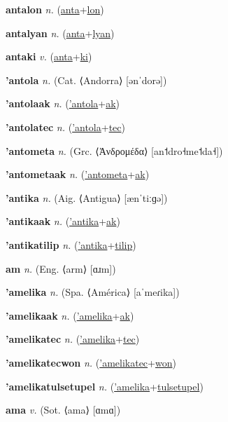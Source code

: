 \textbf{\hypertarget{antalon}{antalon}} \textit{n.} (\hyperlink{anta}{anta}+\allowbreak \hyperlink{lon}{lon})


\textbf{\hypertarget{antalyan}{antalyan}} \textit{n.} (\hyperlink{anta}{anta}+\allowbreak \hyperlink{lyan}{lyan})


\textbf{\hypertarget{antaki}{antaki}} \textit{v.} (\hyperlink{anta}{anta}+\allowbreak \hyperlink{ki}{ki})


\textbf{\hypertarget{'antola}{'antola}} \textit{n.} (Cat. ⟨Andorra⟩ [ənˈdorə])


\textbf{\hypertarget{'antolaak}{'antolaak}} \textit{n.} (\hyperlink{'antola}{'antola}+\allowbreak \hyperlink{ak}{ak})


\textbf{\hypertarget{'antolatec}{'antolatec}} \textit{n.} (\hyperlink{'antola}{'antola}+\allowbreak \hyperlink{tec}{tec})


\textbf{\hypertarget{'antometa}{'antometa}} \textit{n.} (Grc. ⟨Ἀνδρομέδα⟩ [an˦dro˧me˦da˧])


\textbf{\hypertarget{'antometaak}{'antometaak}} \textit{n.} (\hyperlink{'antometa}{'antometa}+\allowbreak \hyperlink{ak}{ak})


\textbf{\hypertarget{'antika}{'antika}} \textit{n.} (Aig. ⟨Antigua⟩ [ænˈtiːɡə])


\textbf{\hypertarget{'antikaak}{'antikaak}} \textit{n.} (\hyperlink{'antika}{'antika}+\allowbreak \hyperlink{ak}{ak})


\textbf{\hypertarget{'antikatilip}{'antikatilip}} \textit{n.} (\hyperlink{'antika}{'antika}+\allowbreak \hyperlink{tilip}{tilip})


\textbf{\hypertarget{am}{am}} \textit{n.} (Eng. ⟨arm⟩ [ɑɹm])


\textbf{\hypertarget{'amelika}{'amelika}} \textit{n.} (Spa. ⟨América⟩ [aˈmeɾika])


\textbf{\hypertarget{'amelikaak}{'amelikaak}} \textit{n.} (\hyperlink{'amelika}{'amelika}+\allowbreak \hyperlink{ak}{ak})


\textbf{\hypertarget{'amelikatec}{'amelikatec}} \textit{n.} (\hyperlink{'amelika}{'amelika}+\allowbreak \hyperlink{tec}{tec})


\textbf{\hypertarget{'amelikatecwon}{'amelikatecwon}} \textit{n.} (\hyperlink{'amelikatec}{'amelikatec}+\allowbreak \hyperlink{won}{won})


\textbf{\hypertarget{'amelikatulsetupel}{'amelikatulsetupel}} \textit{n.} (\hyperlink{'amelika}{'amelika}+\allowbreak \hyperlink{tulsetupel}{tulsetupel})


\textbf{\hypertarget{ama}{ama}} \textit{v.} (Sot. ⟨ama⟩ [ɑmɑ])


